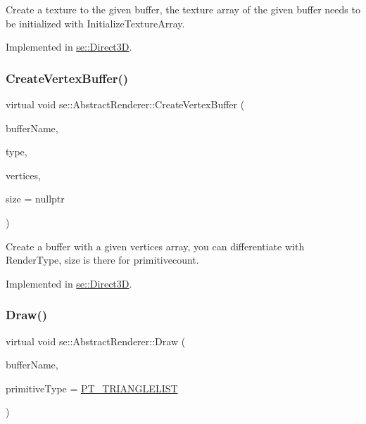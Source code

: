 Create a texture to the given buffer, the texture array of the given buffer needs to be initialized with Initialize\+Texture\+Array. 

Implemented in \mbox{\hyperlink{classse_1_1_direct3_d_a33c350a77a959847d3571e14feb72c85}{se\+::\+Direct3D}}.

\mbox{\label{classse_1_1_abstract_renderer_a953d57d04771acae78c3725bee3639d4}} 
\subsubsection{\texorpdfstring{Create\+Vertex\+Buffer()}{CreateVertexBuffer()}}
{\footnotesize\ttfamily virtual void se\+::\+Abstract\+Renderer\+::\+Create\+Vertex\+Buffer (\begin{DoxyParamCaption}\item[{const std\+::string \&}]{buffer\+Name,  }\item[{\mbox{\hyperlink{namespacese_a9ed62241331cac830c5c1ba8450afc2b}{Render\+Type}}}]{type,  }\item[{\mbox{\hyperlink{structse_1_1_vertex}{Vertex}} $\ast$}]{vertices,  }\item[{\mbox{\hyperlink{namespacese_ada11715de7cf6e87b5dfb4611fe68d29}{Vector3i}} $\ast$}]{size = {\ttfamily nullptr} }\end{DoxyParamCaption})\hspace{0.3cm}{\ttfamily [pure virtual]}}

Create a buffer with a given vertices array, you can differentiate with Render\+Type, size is there for primitivecount. 

Implemented in \mbox{\hyperlink{classse_1_1_direct3_d_a52e0bbf13e8045dab39bb2ef34028a94}{se\+::\+Direct3D}}.

\mbox{\label{classse_1_1_abstract_renderer_ae743059a7b35a9bc1c9108613b43f42f}} 
\subsubsection{\texorpdfstring{Draw()}{Draw()}}
{\footnotesize\ttfamily virtual void se\+::\+Abstract\+Renderer\+::\+Draw (\begin{DoxyParamCaption}\item[{const std\+::string \&}]{buffer\+Name,  }\item[{\mbox{\hyperlink{namespacese_a2b33c0ed67b2f6ac40fc08d56b5984f9}{Primitive\+Type}}}]{primitive\+Type = {\ttfamily \mbox{\hyperlink{namespacese_a2b33c0ed67b2f6ac40fc08d56b5984f9ae5169632705e9235a4423477202499c1}{P\+T\+\_\+\+T\+R\+I\+A\+N\+G\+L\+E\+L\+I\+ST}}} }\end{DoxyParamCaption})\hspace{0.3cm}{\ttfamily [pure virtual]}}

